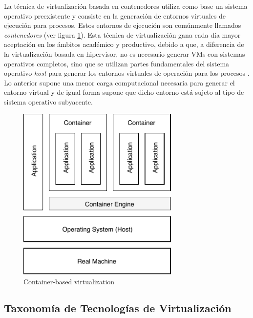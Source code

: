 La técnica de virtualización basada en contenedores utiliza como base un sistema operativo preexistente y consiste en la generación de entornos virtuales de ejecución para procesos. Estos entornos de ejecución son comúnmente llamados \textit{contenedores} (ver figura \ref{fig:container-baseVirtualization}). Esta técnica de virtualización gana cada día mayor aceptación en los ámbitos académico y productivo, debido a que, a diferencia de la virtualización basada en hipervisor, no es necesario generar VMs con sistemas operativos completos, sino que se utilizan partes fundamentales del sistema operativo \textit{host} para generar los entornos virtuales de operación para los procesos \parencite{Kon2017}. Lo anterior supone una menor carga computacional necesaria para generar el entorno virtual y de igual forma supone que dicho entorno está sujeto al tipo de sistema operativo subyacente. 


\begin{figure}[ht] %
	\centering
	\includegraphics[width=8cm]{Pictures/container-baseVirtualization.pdf}
	\vspace{-0.2cm}
	\caption{Container-based virtualization}
	\label{fig:container-baseVirtualization}
\end{figure}


\subsection{Taxonomía de Tecnologías de Virtualización}




